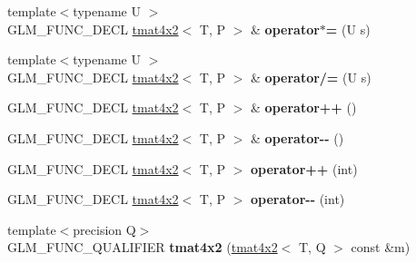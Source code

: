 \begin{DoxyCompactItemize}
\item 
{\footnotesize template$<$typename U $>$ }\\G\+L\+M\+\_\+\+F\+U\+N\+C\+\_\+\+D\+E\+CL \hyperlink{structglm_1_1detail_1_1tmat4x2}{tmat4x2}$<$ T, P $>$ \& {\bfseries operator$\ast$=} (U s)\hypertarget{structglm_1_1detail_1_1tmat4x2_a64135bb813a4b55236de482a753a0b94}{}\label{structglm_1_1detail_1_1tmat4x2_a64135bb813a4b55236de482a753a0b94}

\item 
{\footnotesize template$<$typename U $>$ }\\G\+L\+M\+\_\+\+F\+U\+N\+C\+\_\+\+D\+E\+CL \hyperlink{structglm_1_1detail_1_1tmat4x2}{tmat4x2}$<$ T, P $>$ \& {\bfseries operator/=} (U s)\hypertarget{structglm_1_1detail_1_1tmat4x2_a1d3b62413da2a83289fcba7569ff8486}{}\label{structglm_1_1detail_1_1tmat4x2_a1d3b62413da2a83289fcba7569ff8486}

\item 
G\+L\+M\+\_\+\+F\+U\+N\+C\+\_\+\+D\+E\+CL \hyperlink{structglm_1_1detail_1_1tmat4x2}{tmat4x2}$<$ T, P $>$ \& {\bfseries operator++} ()\hypertarget{structglm_1_1detail_1_1tmat4x2_a601812e90a1d3f22cecdfded3e440d70}{}\label{structglm_1_1detail_1_1tmat4x2_a601812e90a1d3f22cecdfded3e440d70}

\item 
G\+L\+M\+\_\+\+F\+U\+N\+C\+\_\+\+D\+E\+CL \hyperlink{structglm_1_1detail_1_1tmat4x2}{tmat4x2}$<$ T, P $>$ \& {\bfseries operator-\/-\/} ()\hypertarget{structglm_1_1detail_1_1tmat4x2_ad648e4a3b4f36d702b584414291734b0}{}\label{structglm_1_1detail_1_1tmat4x2_ad648e4a3b4f36d702b584414291734b0}

\item 
G\+L\+M\+\_\+\+F\+U\+N\+C\+\_\+\+D\+E\+CL \hyperlink{structglm_1_1detail_1_1tmat4x2}{tmat4x2}$<$ T, P $>$ {\bfseries operator++} (int)\hypertarget{structglm_1_1detail_1_1tmat4x2_a1fe0b314b257ad441100c5d3686e4884}{}\label{structglm_1_1detail_1_1tmat4x2_a1fe0b314b257ad441100c5d3686e4884}

\item 
G\+L\+M\+\_\+\+F\+U\+N\+C\+\_\+\+D\+E\+CL \hyperlink{structglm_1_1detail_1_1tmat4x2}{tmat4x2}$<$ T, P $>$ {\bfseries operator-\/-\/} (int)\hypertarget{structglm_1_1detail_1_1tmat4x2_a585f40b5e70d68bab7efa8a6e302e8d8}{}\label{structglm_1_1detail_1_1tmat4x2_a585f40b5e70d68bab7efa8a6e302e8d8}

\item 
{\footnotesize template$<$precision Q$>$ }\\G\+L\+M\+\_\+\+F\+U\+N\+C\+\_\+\+Q\+U\+A\+L\+I\+F\+I\+ER {\bfseries tmat4x2} (\hyperlink{structglm_1_1detail_1_1tmat4x2}{tmat4x2}$<$ T, Q $>$ const \&m)\hypertarget{structglm_1_1detail_1_1tmat4x2_adbb722f9fddaebd63f497f46b75d004b}{}\label{structglm_1_1detail_1_1tmat4x2_adbb722f9fddaebd63f497f46b75d004b}


\end{DoxyCompactItemize}

